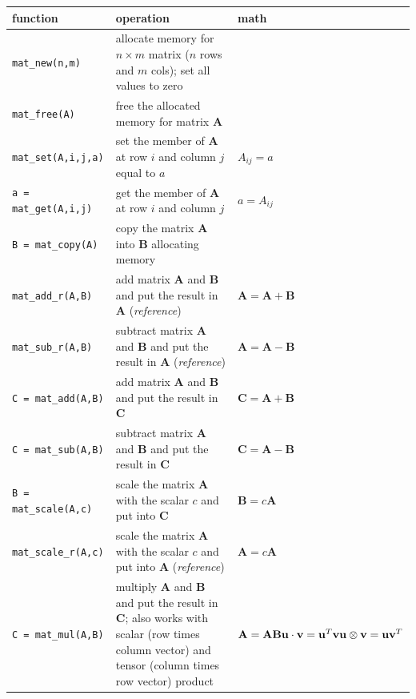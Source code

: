 \documentclass[10pt]{article}
\begin{document}
\vspace{1em}
\noindent
\begin{longtable}{@{} p{3cm} p{5cm} p{3cm} @{}}
\toprule
\textbf{function} & \textbf{operation} & \textbf{math} \\
\midrule

\texttt{mat\_new(n,m)} & allocate memory for $n\times m$ matrix ($n$ rows and $m$ cols); set all values to zero & \\
\addlinespace
\texttt{mat\_free(A)} & free the allocated memory for matrix $\mathbf{A}$ & \\
\addlinespace
\texttt{mat\_set(A,i,j,a)} & set the member of $\mathbf{A}$ at row $i$ and column $j$ equal to $a$ & $A_{ij}=a$ \\
\addlinespace
\texttt{a = mat\_get(A,i,j)} & get the member of $\mathbf{A}$ at row $i$ and column $j$ & $a=A_{ij}$ \\
\addlinespace
\texttt{B = mat\_copy(A)} & copy the matrix $\mathbf{A}$ into $\mathbf{B}$ allocating memory & \\
\addlinespace
\texttt{mat\_add\_r(A,B)} & add matrix $\mathbf{A}$ and $\mathbf{B}$ and put the result in $\mathbf{A}$ (\textit{reference}) & $\mathbf{A}=\mathbf{A}+\mathbf{B}$ \\
\addlinespace
\texttt{mat\_sub\_r(A,B)} & subtract matrix $\mathbf{A}$ and $\mathbf{B}$ and put the result in $\mathbf{A}$ (\textit{reference}) & $\mathbf{A}=\mathbf{A}-\mathbf{B}$ \\
\addlinespace
\texttt{C = mat\_add(A,B)} & add matrix $\mathbf{A}$ and $\mathbf{B}$ and put the result in $\mathbf{C}$ & $\mathbf{C}=\mathbf{A}+\mathbf{B}$ \\
\addlinespace
\texttt{C = mat\_sub(A,B)} & subtract matrix $\mathbf{A}$ and $\mathbf{B}$ and put the result in $\mathbf{C}$ & $\mathbf{C}=\mathbf{A}-\mathbf{B}$ \\
\addlinespace
\texttt{B = mat\_scale(A,c)} & scale the matrix $\mathbf{A}$ with the scalar $c$ and put into $\mathbf{C}$ & $\mathbf{B}=c\mathbf{A}$ \\
\addlinespace
\texttt{mat\_scale\_r(A,c)} & scale the matrix $\mathbf{A}$ with the scalar $c$ and put into $\mathbf{A}$ (\textit{reference}) & $\mathbf{A}=c\mathbf{A}$ \\
\addlinespace
\texttt{C = mat\_mul(A,B)} & multiply $\mathbf{A}$ and $\mathbf{B}$ and put the result in $\mathbf{C}$; also works with scalar (row times column vector) and tensor (column times row vector) product & $\mathbf{A}=\mathbf{A}\mathbf{B}\newline \mathbf{u}\cdot\mathbf{v}=\mathbf{u}^T\mathbf{v}\newline \mathbf{u}\otimes\mathbf{v}=\mathbf{u}\mathbf{v}^T$ \\

\end{longtable}
\end{document}
